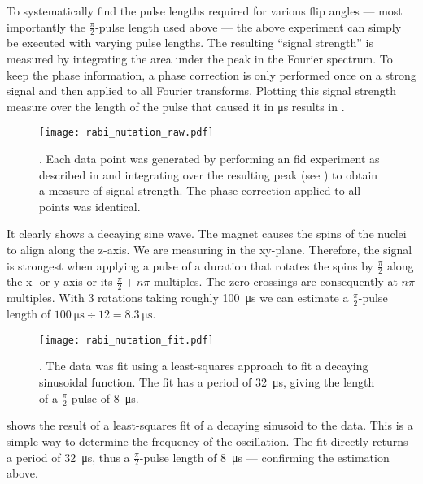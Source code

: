 To systematically find the pulse lengths required for various flip angles --- most importantly the \(\frac{\pi}{2}\)-pulse length used above --- the above experiment can simply be executed with varying pulse lengths. The resulting \enquote{signal strength} is measured by integrating the area under the peak in the Fourier spectrum. To keep the phase information, a phase correction is only performed once on a strong signal and then applied to all Fourier transforms. Plotting this signal strength measure over the length of the pulse that caused it in \si{\micro\second} results in .

\begin{figure}[h!bt]
    \centering
    \texttt{[image: rabi\_nutation\_raw.pdf]}
    \caption{. Each data point was generated by performing an \acrshort{fid} experiment as described in  and integrating over the resulting peak (see ) to obtain a measure of signal strength. The phase correction applied to all points was identical.}
\end{figure}

It clearly shows a decaying sine wave. The magnet causes the spins of the nuclei to align along the z-axis. We are measuring in the xy-plane. Therefore, the signal is strongest when applying a pulse of a duration that rotates the spins by \(\frac{\pi}{2}\) along the x- or y-axis or its \(\frac{\pi}{2} + n\pi{}\) multiples. The zero crossings are consequently at \(n\pi{}\) multiples. With 3 rotations taking roughly \qty{100}{\micro\second} we can estimate a \(\frac{\pi}{2}\)-pulse length of \(\qty{100}{\micro\second}\div 12 = \qty{8.3}{\micro\second}\).

\begin{figure}[h!bt]
    \centering
    \texttt{[image: rabi\_nutation\_fit.pdf]}
    \caption{. The data was fit using a least-squares approach to fit a decaying sinusoidal function. The fit has a period of \qty{32}{\micro\second}, giving the length of a $\frac{\pi}{2}$-pulse of \qty{8}{\micro\second}.}
\end{figure}

 shows the result of a least-squares fit of a decaying sinusoid to the data. This is a simple way to determine the frequency of the oscillation. The fit directly returns a period of \qty{32}{\micro\second}, thus a \(\frac{\pi}{2}\)-pulse length of \qty{8}{\micro\second} --- confirming the estimation above.

